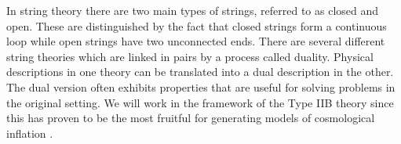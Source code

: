 In string theory there are two main
types of strings, referred to as closed and open. These are distinguished by the fact
that closed
strings form a continuous loop while open strings have two unconnected ends. 
% 
There are several different string theories which are linked in pairs by a process
called
duality. Physical descriptions in one theory can be translated into a
dual description in the other. The dual version often exhibits properties that
are useful for solving problems in the original setting.
We will work in the framework of the Type IIB theory since this has proven
to be the most
fruitful for generating models of cosmological inflation \cite{cline,
Linde:2005dd}. 
% 

